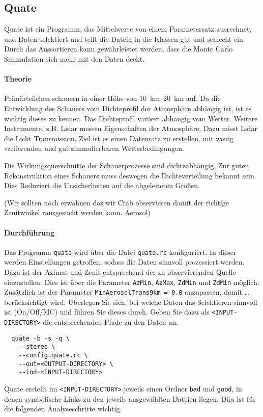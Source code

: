 \subsection{Quate}%
\label{sub:quate}

Quate ist ein Programm,
das Mittelwerte von einem Parametersatz ausrechnet,
und Daten selektiert und teilt die Datein in die Klassen gut und schlecht ein.
Durch das Aussortieren kann gewährleistet werden, 
dass die Monte Carlo Simmulation sich mehr mit den Daten deckt. 

\paragraph{Theorie}%
\label{par:theorie}
Primärteilchen schauern in einer Höhe von \SIrange{10}{20}{\kilo\meter}
auf.
Da die Entwicklung des Schauers vom Dichteprofil der Atmosphäre abhängig ist, 
ist es wichtig dieses zu kennen. 
Das Dichteprofil variiert abhängig vom Wetter. 
Weitere Instrumente, z.B. Lidar messen Eigenschaften der Atmosphäre.
Dazu misst Lidar die Licht Transmission.
Ziel ist es einen Datensatz zu erstellen,
mit wenig variierenden und gut simmulierbaren Wetterbedingungen.

Die Wirkungsquerschnitte der Schauerprozesse sind dichteabhängig.
Zur guten Rekonstruktion eines Schauers muss deswegen die Dichteverteilung
bekannt sein.
Dies Reduziert die Unsicherheiten auf die abgeleiteten Größen. 

{\color{red}(Wir sollten noch erwähnen das wir Crab observieren damit der
richtige Zenitwinkel rausgesucht werden kann. Aerosol)}

\paragraph{Durchführung}%
Das Programm \texttt{quate} wird über die
Datei \texttt{quate.rc} konfiguriert.
In dieser werden Einstellungen getroffen,
sodass die Daten sinnvoll prozessiert werden.
Dazu ist der Azimut und Zenit entsprechend der zu
observierenden Quelle einzustellen.
Dies ist über die Parameter \texttt{AzMin},
\texttt{AzMax}, \texttt{ZdMin} und \texttt{ZdMin}
möglich.
Zusätzlich ist der Parameter
\texttt{MinAerosolTrans9km = 0.8} anzupassen,
damit {\color{red}\ldots} berücksichtigt wird.
Überlegen Sie sich,
bei welche Daten das Selektieren sinnvoll ist
(On/Off/MC)
und führen Sie dieses durch.
Geben Sie dazu als \texttt{<INPUT-DIRECTORY>} die entsprechenden Pfade zu den Daten an.

\begin{lstlisting}
  quate -b -s -q \
    --stereo \
    --config=quate.rc \
    --out=<OUTPUT-DIRECTORY> \
    --ind=<INPUT-DIRECTORY>
\end{lstlisting}
Quate erstellt im \texttt{<INPUT-DIRECTORY>}
jeweils einen Ordner \texttt{bad} und \texttt{good},
in denen symbolische Links zu den jeweils ausgewählten Dateien liegen.
Dies ist für die folgenden Analyseschritte wichtig.

